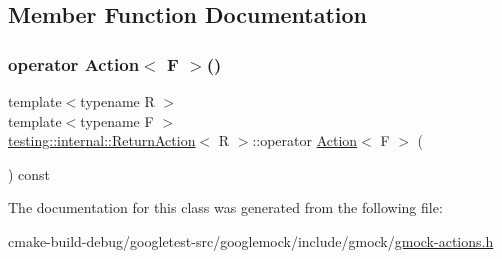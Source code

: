 \subsection{Member Function Documentation}
\mbox{\label{classtesting_1_1internal_1_1ReturnAction_a1aab69c4ea104e76e70ba209763f61d5}} 
\subsubsection{\texorpdfstring{operator Action$<$ F $>$()}{operator Action< F >()}}
{\footnotesize\ttfamily template$<$typename R $>$ \\
template$<$typename F $>$ \\
\mbox{\hyperlink{classtesting_1_1internal_1_1ReturnAction}{testing\+::internal\+::\+Return\+Action}}$<$ R $>$\+::operator \mbox{\hyperlink{classtesting_1_1Action}{Action}}$<$ F $>$ (\begin{DoxyParamCaption}{ }\end{DoxyParamCaption}) const\hspace{0.3cm}{\ttfamily [inline]}}



The documentation for this class was generated from the following file\+:\begin{DoxyCompactItemize}
\item 
cmake-\/build-\/debug/googletest-\/src/googlemock/include/gmock/\mbox{\hyperlink{gmock-actions_8h}{gmock-\/actions.\+h}}\end{DoxyCompactItemize}
